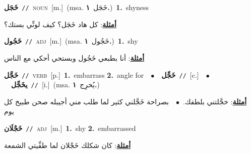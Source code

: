 \documentclass[10pt,a4paper,twoside]{article} %
\begin{document}
\begin{multicols}{2}
{\setlength\topsep{0pt}\textbf{\foreignlanguage{arabic}{خَجَل}}\ {\color{gray}\texttt{//}\color{black}}\ \textsc{noun}\ [m.]\ \color{gray}(msa. \foreignlanguage{arabic}{خَجَل}~\foreignlanguage{arabic}{\textbf{١.}})\color{black}\ \textbf{1.}~shyness\  \begin{flushright}\color{gray}\foreignlanguage{arabic}{\textbf{\underline{\foreignlanguage{arabic}{أمثلة}}}: كل هاد خَجَل؟ كيف لونِّي بستك؟}\end{flushright}\color{black}} \vspace{2mm}

{\setlength\topsep{0pt}\textbf{\foreignlanguage{arabic}{خَجُول}}\ {\color{gray}\texttt{//}\color{black}}\ \textsc{adj}\ [m.]\ \color{gray}(msa. \foreignlanguage{arabic}{خَجُول}~\foreignlanguage{arabic}{\textbf{١.}})\color{black}\ \textbf{1.}~shy\  \begin{flushright}\color{gray}\foreignlanguage{arabic}{\textbf{\underline{\foreignlanguage{arabic}{أمثلة}}}: أنا بطبعي خَجُول وبستحي أحكي مع الناس}\end{flushright}\color{black}} \vspace{2mm}

{\setlength\topsep{0pt}\textbf{\foreignlanguage{arabic}{خَجَّل}}\ {\color{gray}\texttt{//}\color{black}}\ \textsc{verb}\ [p.]\ \textbf{1.}~embarrass  \textbf{2.}~angle for\ \ $\bullet$\ \ \setlength\topsep{0pt}\textbf{\foreignlanguage{arabic}{خَجِّل}}\ {\color{gray}\texttt{//}\color{black}}\ [c.]\ \ $\bullet$\ \ \setlength\topsep{0pt}\textbf{\foreignlanguage{arabic}{يخَجِّل}}\ {\color{gray}\texttt{//}\color{black}}\ [i.]\ \color{gray}(msa. \foreignlanguage{arabic}{يُحرِج}~\foreignlanguage{arabic}{\textbf{١.}})\color{black}\  \begin{flushright}\color{gray}\foreignlanguage{arabic}{\textbf{\underline{\foreignlanguage{arabic}{أمثلة}}}: خجَّلتني بلطفك.\ $\bullet$\ \  بصراحة خَجَّلني كثير لما طلب مني أجيبله صحن طبيخ كل يوم}\end{flushright}\color{black}} \vspace{2mm}

{\setlength\topsep{0pt}\textbf{\foreignlanguage{arabic}{خَجْلَان}}\ {\color{gray}\texttt{//}\color{black}}\ \textsc{adj}\ [m.]\ \textbf{1.}~shy  \textbf{2.}~embarrassed\  \begin{flushright}\color{gray}\foreignlanguage{arabic}{\textbf{\underline{\foreignlanguage{arabic}{أمثلة}}}: كان شكلك خَجْلان لما طفِّيتي الشمعة}\end{flushright}\color{black}} \vspace{2mm}


\end{multicols}
\end{document}
